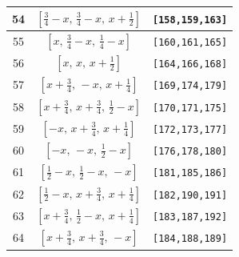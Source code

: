 \documentclass[fleqn,8pt]{jsarticle}
\begin{document}
\begin{longtable}{ccc}
54 & $\left[ \frac{3}{4} - x,\, \frac{3}{4} - x,\, x + \frac{1}{2} \right]$ & {\tt [158,159,163]} \\ \hline
55 & $\left[ x,\, \frac{3}{4} - x,\, \frac{1}{4} - x \right]$ & {\tt [160,161,165]} \\ \hline
56 & $\left[ x,\, x,\, x + \frac{1}{2} \right]$ & {\tt [164,166,168]} \\ \hline
57 & $\left[ x + \frac{3}{4},\, - x,\, x + \frac{1}{4} \right]$ & {\tt [169,174,179]} \\ \hline
58 & $\left[ x + \frac{3}{4},\, x + \frac{3}{4},\, \frac{1}{2} - x \right]$ & {\tt [170,171,175]} \\ \hline
59 & $\left[ - x,\, x + \frac{3}{4},\, x + \frac{1}{4} \right]$ & {\tt [172,173,177]} \\ \hline
60 & $\left[ - x,\, - x,\, \frac{1}{2} - x \right]$ & {\tt [176,178,180]} \\ \hline
61 & $\left[ \frac{1}{2} - x,\, \frac{1}{2} - x,\, - x \right]$ & {\tt [181,185,186]} \\ \hline
62 & $\left[ \frac{1}{2} - x,\, x + \frac{3}{4},\, x + \frac{1}{4} \right]$ & {\tt [182,190,191]} \\ \hline
63 & $\left[ x + \frac{3}{4},\, \frac{1}{2} - x,\, x + \frac{1}{4} \right]$ & {\tt [183,187,192]} \\ \hline
64 & $\left[ x + \frac{3}{4},\, x + \frac{3}{4},\, - x \right]$ & {\tt [184,188,189]} \\
\end{longtable}
\renewcommand{\arraystretch}{1.2}
\end{document}
